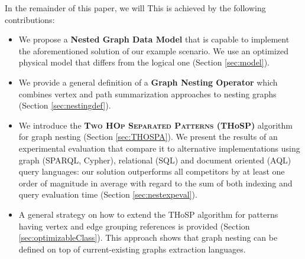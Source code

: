 In the remainder of this paper, we will  This is achieved by the following contributions:

\begin{itemize}
	\item We propose a \textbf{Nested Graph Data Model} that is capable to implement the aforementioned solution of our example scenario. We use an optimized physical model that differs from the logical one (Section \ref{sec:model}).
	
	\item We provide  a general definition of a \textbf{Graph Nesting Operator} which combines vertex and path summarization approaches to nesting graphs (Section \ref{sec:nestingdef}).
	\item We introduce the  \textbf{\textsc{{Two HOp Separated Patterns}} (THoSP)} algorithm for graph nesting (Section \ref{sec:THOSPA}). We present the results of an experimental evaluation that compare it to alternative implementations using graph (SPARQL, Cypher), relational (SQL) and document oriented (AQL) query languages: our solution outperforms all competitors by at least one order of magnitude in average with regard to the sum of both indexing and query evaluation time (Section \ref{sec:nestexpeval}).
	
	\item A general strategy on how to extend the THoSP algorithm for patterns having vertex and edge grouping references is provided (Section \ref{sec:optimizableClass}). This approach shows that graph nesting can be defined on top of current-existing graphs extraction languages.
\end{itemize}



